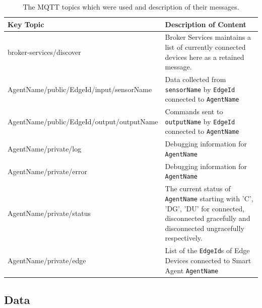 \begin{center}
    \begin{table}
        \begin{tabular}{ | l | p{7cm} |}
        \hline
        Key Topic & Description of Content \\ \hline
        broker-services/discover & Broker Services maintains a list of currently connected devices here as a retained message.\\ \hline
        AgentName/public/EdgeId/input/sensorName & Data collected from \verb|sensorName| by \verb|EdgeId| connected to \verb|AgentName| \\ \hline
        AgentName/public/EdgeId/output/outputName & Commands sent to \verb|outputName| by \verb|EdgeId| connected to \verb|AgentName| \\ \hline
        AgentName/private/log & Debugging information for \verb|AgentName| \\ \hline
        AgentName/private/error & Debugging information for \verb|AgentName| \\ \hline
        AgentName/private/status & The current status of \verb|AgentName| starting with 'C', 'DG', 'DU' for connected, disconnected gracefully and disconnected ungracefully respectively. \\ \hline
        AgentName/private/edge & List of the \verb|EdgeId|s of Edge Devices connected to Smart Agent \verb|AgentName| \\
        \hline
        \end{tabular}
        \caption{The MQTT topics which were used and description of their messages.}
    \end{table}
\end{center}


\subsection{Data}

